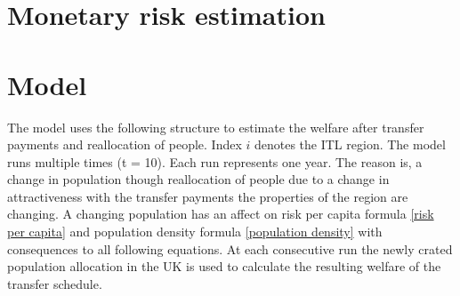 \documentclass[10pt,a4]{article}
\begin{document}
\section{Monetary risk estimation}
\section{Model}

The model uses the following structure to estimate the welfare after transfer payments and reallocation of people. Index $i$ denotes the ITL region.
The model runs multiple times (t = 10). Each run represents one year. The reason is, a change in population though reallocation of people due to a change in attractiveness with the transfer payments the properties of the region are changing. A changing population has an affect on risk per capita formula \ref{risk per capita} and population density formula \ref{population density} with consequences to all following equations. At each consecutive run the newly crated population allocation in the UK is used to calculate the resulting welfare of the transfer schedule.
\newline
\end{document}
